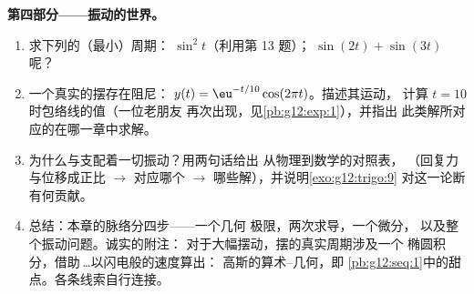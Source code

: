 \begin{problem}
\medskip
\noindent\textbf{第四部分——振动的世界。}
\begin{enumerate}[resume]
  \item 求下列的（最小）周期：
        $\sin^2 t$（利用第 13 题）；
        $\sin(2t) + \sin(3t)$ 呢？
  \item 一个真实的摆存在阻尼：
        $y(t) = \eu^{-t/10}\cos(2\pi t)$。描述其运动，
        计算 $t = 10$ 时包络线的值（一位老朋友
        再次出现，见\cref{pb:g12:exp:1}），并指出
        此类解所对应的在哪一章中求解。
  \item 为什么与支配着一切振动？用两句话给出
        从物理到数学的对照表，
        （回复力与位移成正比
        $\rightarrow$ 对应哪个 $\rightarrow$
        哪些解），并说明\cref{exo:g12:trigo:9}
        对这一论断有何贡献。
  \item 总结：本章的脉络分四步——一个几何
        极限，两次求导，一个微分，
        以及整个振动问题。诚实的附注：
        对于大幅摆动，摆的真实周期涉及一个
        椭圆积分，借助\,\dots 以闪电般的速度算出：
        高斯的算术--几何，即
        \cref{pb:g12:seq:1}中的甜点。各条线索自行连接。
\end{enumerate}
\end{problem}
